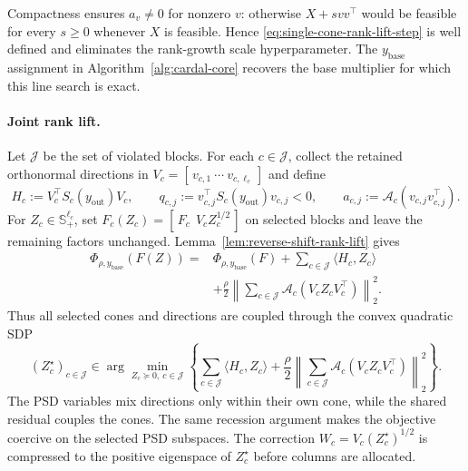 \documentclass[11pt]{article}
\theoremstyle{definition}
\theoremstyle{remark}
\begin{document}
Compactness ensures $a_v\neq0$ for nonzero $v$:
otherwise $X+s vv^\top$ would be feasible for every $s\geq0$ whenever $X$ is
feasible.  Hence \eqref{eq:single-cone-rank-lift-step} is well defined and
eliminates the rank-growth scale hyperparameter.
The $y_{\mathrm{base}}$ assignment in Algorithm~\ref{alg:cardal-core}
recovers the base multiplier for which this line search is exact.

\paragraph{Joint rank lift.}
Let $\mathcal J$ be the set of violated blocks.  For each $c\in\mathcal J$,
collect the retained orthonormal directions in
$V_c=[\,v_{c,1}\ \cdots\ v_{c,\ell_c}\,]$ and define
\[
  H_c:=V_c^\top S_c(y_{\mathrm{out}})V_c,
  \qquad
  q_{c,j}:=v_{c,j}^\top S_c(y_{\mathrm{out}})v_{c,j}<0,
  \qquad
  a_{c,j}:=\mathcal A_c(v_{c,j}v_{c,j}^\top).
\]
For $Z_c\in\mathbb S_+^{\ell_c}$, set
$F_c(Z_c)=[\,F_c\ \ V_cZ_c^{1/2}\,]$ on selected blocks and leave the
remaining factors unchanged.  Lemma~\ref{lem:reverse-shift-rank-lift} gives
\begin{equation}
\begin{aligned}
  \Phi_{\rho,y_{\mathrm{base}}}(F(Z))
  ={}&\Phi_{\rho,y_{\mathrm{base}}}(F)
  +\sum_{c\in\mathcal J}\langle H_c,Z_c\rangle\\
  &+\frac{\rho}{2}
    \left\|
      \sum_{c\in\mathcal J}
        \mathcal A_c(V_cZ_cV_c^\top)
    \right\|_2^2.
\end{aligned}
  \label{eq:joint-rank-lift-restriction}
\end{equation}
Thus all selected cones and directions are coupled through the convex
quadratic SDP
\begin{equation}
  (Z_c^\star)_{c\in\mathcal J}
  \in
  \arg\min_{Z_c\succeq0,\ c\in\mathcal J}
  \left\{
    \sum_{c\in\mathcal J}\langle H_c,Z_c\rangle
    +\frac{\rho}{2}
      \left\|
        \sum_{c\in\mathcal J}
          \mathcal A_c(V_cZ_cV_c^\top)
      \right\|_2^2
  \right\}.
  \label{eq:product-joint-rank-lift-step}
\end{equation}
The PSD variables mix directions only within their own cone, while the
shared residual couples the cones.  The same recession argument makes the
objective coercive on the selected PSD subspaces.  The correction
$W_c=V_c(Z_c^\star)^{1/2}$ is compressed to the positive eigenspace of
$Z_c^\star$ before columns are allocated.
\end{document}
